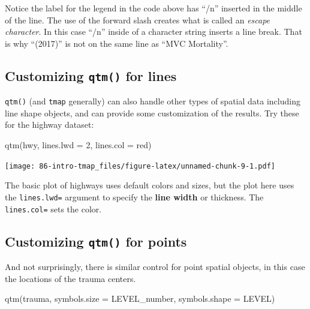 \documentclass[
]{book}
\newenvironment{Shaded}{\begin{snugshade}}{\end{snugshade}}
\newcommand{\AttributeTok}[1]{\textcolor[rgb]{0.77,0.63,0.00}{#1}}
\newcommand{\DecValTok}[1]{\textcolor[rgb]{0.00,0.00,0.81}{#1}}
\newcommand{\FunctionTok}[1]{\textcolor[rgb]{0.00,0.00,0.00}{#1}}
\newcommand{\NormalTok}[1]{#1}
\newcommand{\StringTok}[1]{\textcolor[rgb]{0.31,0.60,0.02}{#1}}
\newenvironment{rmdnote}[1]
  {
  \begin{itemize}
  \renewcommand{\labelitemi}{
    \raisebox{-.7\height}[0pt][0pt]{
      {\setkeys{Gin}{width=3em,keepaspectratio}\texttt{[image: images/\#1]}}
    }
  }
  \setlength{\fboxsep}{1em}
  \begin{note}
  \item
  }
  {
  \end{note}
  \end{itemize}
  }
\begin{document}
\begin{rmdnote}{note}
Notice the label for the legend in the code above has ``/n'' inserted in the middle of the line. The use of the forward slash creates what is called an \emph{escape character}. In this case ``/n'' inside of a character string inserts a line break. That is why ``(2017)'' is not on the same line as ``MVC Mortality''.

\end{rmdnote}

\hypertarget{customizing-qtm-for-lines}{%
\subsection{\texorpdfstring{Customizing \texttt{qtm()} for lines}{Customizing qtm() for lines}}\label{customizing-qtm-for-lines}}

\texttt{qtm()} (and \texttt{tmap} generally) can also handle other types of spatial data including line shape objects, and can provide some customization of the results. Try these for the highway dataset:

\begin{Shaded}
\begin{Highlighting}[]
\FunctionTok{qtm}\NormalTok{(hwy, }
    \AttributeTok{lines.lwd =} \DecValTok{2}\NormalTok{, }
    \AttributeTok{lines.col =} \StringTok{\textquotesingle{}red\textquotesingle{}}\NormalTok{)}
\end{Highlighting}
\end{Shaded}

\texttt{[image: 86-intro-tmap\_files/figure-latex/unnamed-chunk-9-1.pdf]}

The basic plot of highways uses default colors and sizes, but the plot here uses the \texttt{lines.lwd=} argument to specify the \textbf{line width} or thickness. The \texttt{lines.col=} sets the color.

\hypertarget{customizing-qtm-for-points}{%
\subsection{\texorpdfstring{Customizing \texttt{qtm()} for points}{Customizing qtm() for points}}\label{customizing-qtm-for-points}}

And not surprisingly, there is similar control for point spatial objects, in this case the locations of the trauma centers.

\begin{Shaded}
\begin{Highlighting}[]
\FunctionTok{qtm}\NormalTok{(trauma,}
    \AttributeTok{symbols.size =} \StringTok{\textquotesingle{}LEVEL\_number\textquotesingle{}}\NormalTok{, }
    \AttributeTok{symbols.shape =} \StringTok{\textquotesingle{}LEVEL\textquotesingle{}}\NormalTok{)}
\end{Highlighting}
\end{Shaded}
\end{document}
